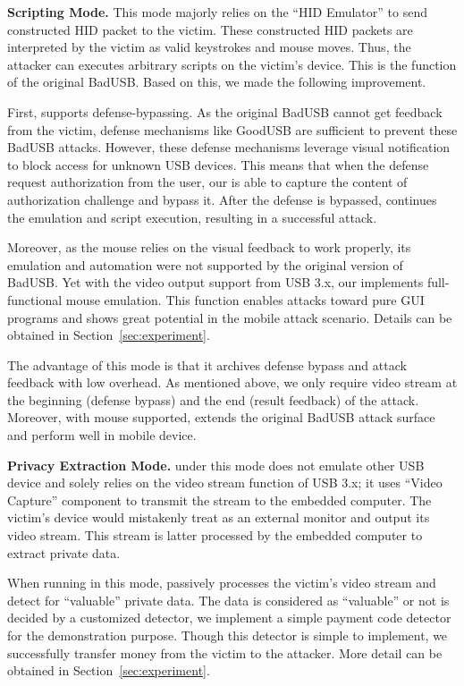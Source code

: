 \textbf{Scripting Mode.} This mode majorly relies on the ``HID Emulator'' to
send constructed HID packet to the victim. These constructed HID packets are
interpreted by the victim as valid keystrokes and mouse moves. Thus, the
attacker can executes arbitrary scripts on the victim's device. This is the
function of the original BadUSB. Based on this, we made the following
improvement.

First, \tool supports defense-bypassing. As the original BadUSB cannot get
feedback from the victim, defense mechanisms like GoodUSB
\cite{tian2015defending} are sufficient to prevent these BadUSB attacks.
However, these defense mechanisms leverage visual notification to block access
for unknown USB devices. This means that when the defense request authorization
from the user, our \tool is able to capture the content of authorization
challenge and bypass it. After the defense is bypassed, \tool continues the
emulation and script execution, resulting in a successful attack.

Moreover, as the mouse relies on the visual feedback to work properly, its
emulation and automation were not supported by the original version of BadUSB.
Yet with the video output support from USB 3.x, our \tool implements
full-functional mouse emulation. This function enables attacks toward pure GUI
programs and shows great potential in the mobile attack scenario. Details can
be obtained in Section~\ref{sec:experiment}.

The advantage of this mode is that it archives defense bypass and attack
feedback with low overhead.  
As mentioned above, we only require video stream at the beginning (defense
bypass) and the end (result feedback) of the attack. Moreover, with mouse
supported, \tool extends the original BadUSB attack surface and perform well in
mobile device.

\textbf{Privacy Extraction Mode.} \tool under this mode does not emulate other
USB device and solely relies on the video stream function of USB 3.x; it uses
``Video Capture'' component to transmit the stream to the embedded
computer. The victim's device would mistakenly treat \tool as an external monitor
and output its video stream. This stream is latter processed by the embedded
computer to extract private data.

When running in this mode, \tool passively processes the victim's video stream
and detect for ``valuable'' private data.  The data is considered as
``valuable'' or not is decided by a customized detector, we implement a simple
payment code detector for the demonstration purpose. Though this detector is
simple to implement, we successfully transfer money from the victim to the
attacker. More detail can be obtained in Section~\ref{sec:experiment}.

